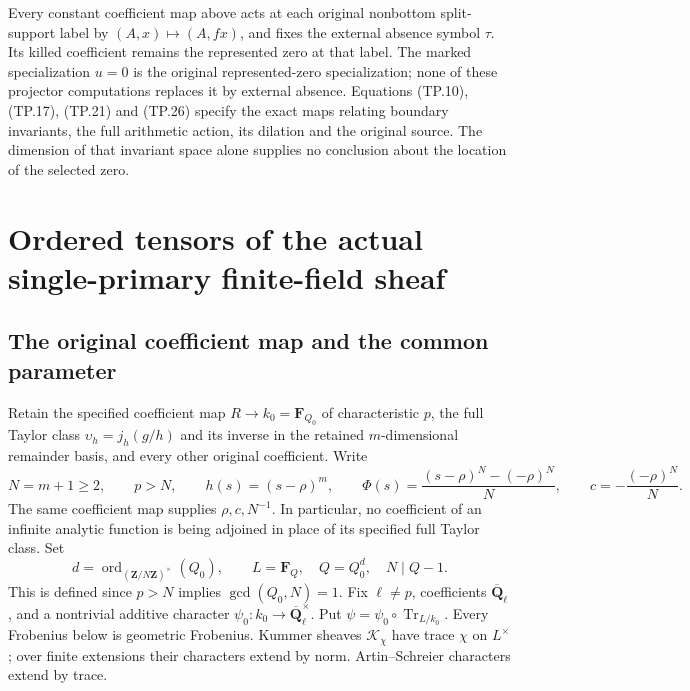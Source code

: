 Every constant coefficient map above acts at each original
nonbottom split-support label by \((A,x)\mapsto(A,fx)\),
and fixes the external absence symbol \(\tau\). Its killed
coefficient remains the represented zero at that label.
The marked specialization \(u=0\) is the original
represented-zero specialization; none of these projector
computations replaces it by external absence. Equations
(TP.10), (TP.17), (TP.21) and (TP.26) specify the exact maps
relating boundary invariants, the full arithmetic action,
its dilation and the original source. The dimension of
that invariant space alone supplies no conclusion about
the location of the selected zero.

\section{Ordered tensors of the actual single-primary finite-field sheaf}
\label{sec:TPF}

\subsection{The original coefficient map and the common parameter}

Retain the specified coefficient map \(R\to k_0=\mathbf F_{Q_0}\)
of characteristic \(p\), the full Taylor class
\(\upsilon_h=j_h(g/h)\) and its inverse in the retained
\(m\)-dimensional remainder basis, and every other original
coefficient. Write
\[
 N=m+1\ge2,\qquad p>N,\qquad
 h(s)=(s-\rho)^m,\qquad
 \Phi(s)=\frac{(s-\rho)^N-(-\rho)^N}{N},\qquad
 c=-\frac{(-\rho)^N}{N}.
 \tag{TPF.1}\label{eq:TPF1}
\]
The same coefficient map supplies \(\rho,c,N^{-1}\). In
particular, no coefficient of an infinite analytic function
is being adjoined in place of its specified full Taylor class.
Set
\[
 d=\operatorname{ord}_{(\mathbf Z/N\mathbf Z)^\times}(Q_0),
 \qquad L=\mathbf F_Q,\quad Q=Q_0^d,\quad N\mid Q-1.
 \tag{TPF.2}\label{eq:TPF2}
\]
This is defined since \(p>N\) implies \(\gcd(Q_0,N)=1\).
Fix \(\ell\ne p\), coefficients \(\overline{\mathbf Q}_\ell\),
and a nontrivial additive character \(\psi_0:k_0\to
\overline{\mathbf Q}_\ell^\times\). Put
\(\psi=\psi_0\circ\operatorname{Tr}_{L/k_0}\).
Every Frobenius below is geometric Frobenius. Kummer sheaves
\(\mathcal K_\chi\) have trace \(\chi\) on \(L^\times\);
over finite extensions their characters extend by norm.
Artin--Schreier characters extend by trace.

